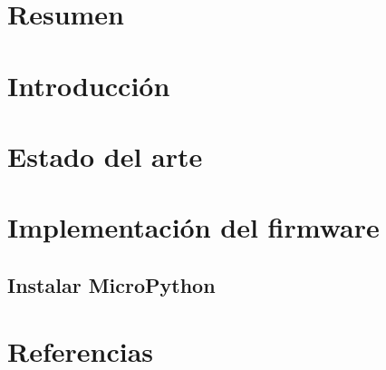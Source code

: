 


	


  \chapter*{Resumen}
    

  \tableofcontents \label{chapter:contents}

  \chapter{Introducción}
    

  \chapter{Estado del arte}
    
  
	\chapter{Implementación del firmware}
    \section{Instalar MicroPython}
	 	    
	 	    
  \chapter{Referencias}      
    \printbibliography[heading=none]

